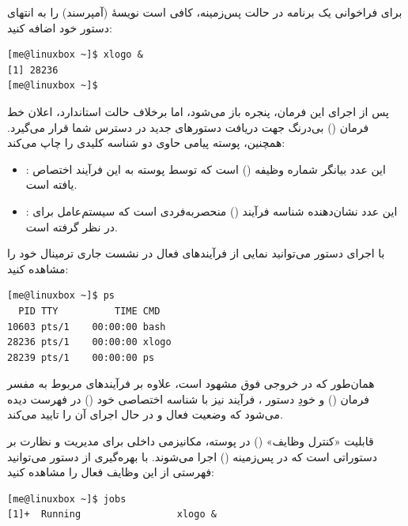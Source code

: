 برای فراخوانی یک برنامه در حالت پس‌زمینه، کافی است نویسهٔ \cmd{\&} (آمپرسند) را به انتهای دستور خود اضافه کنید:

\begin{latin}
\begin{lstlisting}
[me@linuxbox ~]$ xlogo &
[1] 28236
[me@linuxbox ~]$
\end{lstlisting}
\end{latin}

پس از اجرای این فرمان، پنجره  باز می‌شود، اما برخلاف حالت استاندارد، اعلان خط فرمان () بی‌درنگ جهت دریافت دستورهای جدید در دسترس شما قرار می‌گیرد. همچنین، پوسته پیامی حاوی دو شناسه کلیدی را چاپ می‌کند:

\begin{itemize}
  \item \cmd{[1]}: این عدد بیانگر شماره وظیفه () است که توسط پوسته به این فرآیند اختصاص یافته است.
  \item {}: این عدد نشان‌دهنده شناسه فرآیند () منحصربه‌فردی است که سیستم‌عامل برای  در نظر گرفته است.
\end{itemize}

با اجرای دستور  می‌توانید نمایی از فرآیندهای فعال در نشست جاری ترمینال خود را مشاهده کنید:

\begin{latin}
\begin{lstlisting}
[me@linuxbox ~]$ ps
  PID TTY          TIME CMD
10603 pts/1    00:00:00 bash
28236 pts/1    00:00:00 xlogo
28239 pts/1    00:00:00 ps
\end{lstlisting}
\end{latin}

همان‌طور که در خروجی فوق مشهود است، علاوه بر فرآیندهای مربوط به مفسر فرمان () و خودِ دستور ، فرآیند  نیز با شناسه اختصاصی خود () در فهرست دیده می‌شود که وضعیت فعال و در حال اجرای آن را تایید می‌کند.

قابلیت «کنترل وظایف» () در پوسته، مکانیزمی داخلی برای مدیریت و نظارت بر دستوراتی است که در پس‌زمینه () اجرا می‌شوند. با بهره‌گیری از دستور  می‌توانید فهرستی از این وظایف فعال را مشاهده کنید:

\begin{latin}
\begin{lstlisting}
[me@linuxbox ~]$ jobs
[1]+  Running                 xlogo &
\end{lstlisting}
\end{latin}

